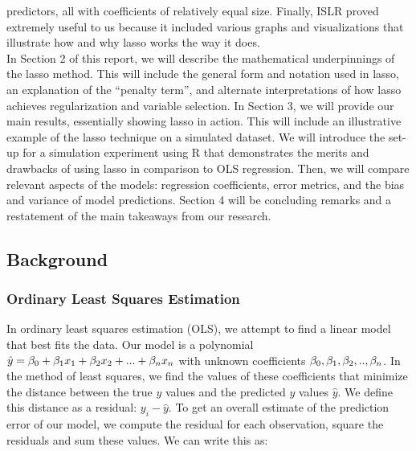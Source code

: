 \documentclass[
]{article}
\begin{document}
predictors, all with coefficients of relatively equal size. Finally,
ISLR proved extremely useful to us because it included various graphs
and visualizations that illustrate how and why lasso works the way it
does.\\
\hspace*{0.333em}\hspace*{0.333em}\hspace*{0.333em}\hspace*{0.333em}In
Section 2 of this report, we will describe the mathematical
underpinnings of the lasso method. This will include the general form
and notation used in lasso, an explanation of the ``penalty term'', and
alternate interpretations of how lasso achieves regularization and
variable selection. In Section 3, we will provide our main results,
essentially showing lasso in action. This will include an illustrative
example of the lasso technique on a simulated dataset. We will introduce
the set-up for a simulation experiment using R that demonstrates the
merits and drawbacks of using lasso in comparison to OLS regression.
Then, we will compare relevant aspects of the models: regression
coefficients, error metrics, and the bias and variance of model
predictions. Section 4 will be concluding remarks and a restatement of
the main takeaways from our research.

\hypertarget{background}{%
\subsection{Background}\label{background}}

\hypertarget{ordinary-least-squares-estimation}{%
\subsubsection{Ordinary Least Squares
Estimation}\label{ordinary-least-squares-estimation}}

In ordinary least squares estimation (OLS), we attempt to find a linear
model that best fits the data. Our model is a polynomial
\(\hat{y} = \beta_0 +\beta_1x_1 + \beta_2x_2 + \space ... \space + \beta_nx_n\)
with unknown coefficients
\(\beta_0, \space \beta_1, \space \beta_2, \space .., \space \beta_n\).
In the method of least squares, we find the values of these coefficients
that minimize the distance between the true \(y\) values and the
predicted \(y\) values \(\hat{y}\). We define this distance as a
residual: \(y_i- \hat{y}\). To get an overall estimate of the prediction
error of our model, we compute the residual for each observation, square
the residuals and sum these values. We can write this as:
\end{document}
